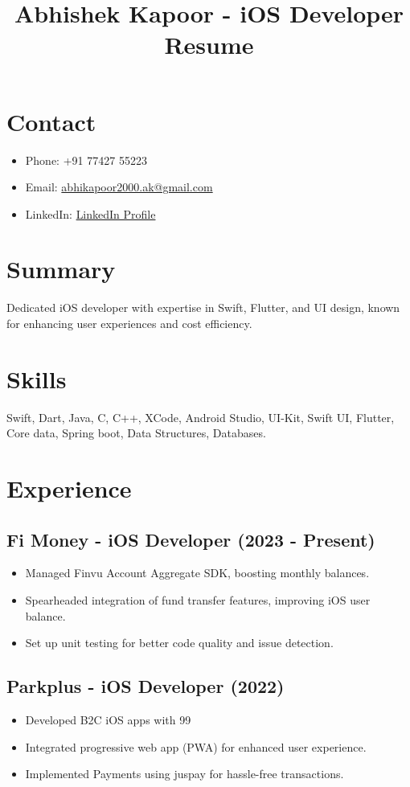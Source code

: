 \documentclass[a4paper,10pt]{article}
\makeatletter
\renewcommand\maketitle{
    \begin{flushleft}
        \huge\textbf{\@title}
    \end{flushleft}
}
\makeatother
\begin{document}
\title{Abhishek Kapoor - iOS Developer Resume}
\date{}
\maketitle

\section*{Contact}
\begin{itemize}
    \item Phone: +91 77427 55223
    \item Email: \href{mailto:abhikapoor2000.ak@gmail.com}{abhikapoor2000.ak@gmail.com}
    \item LinkedIn: \href{https://www.linkedin.com/in/abhishekkapoorfullstack/}{LinkedIn Profile}
\end{itemize}

\section*{Summary}
Dedicated iOS developer with expertise in Swift, Flutter, and UI design, known for enhancing user experiences and cost efficiency.

\section*{Skills}
Swift, Dart, Java, C, C++, XCode, Android Studio, UI-Kit, Swift UI, Flutter, Core data, Spring boot, Data Structures, Databases.

\section*{Experience}

\subsection*{Fi Money - iOS Developer (2023 - Present)}
\begin{itemize}
    \item Managed Finvu Account Aggregate SDK, boosting monthly balances.
    \item Spearheaded integration of fund transfer features, improving iOS user balance.
    \item Set up unit testing for better code quality and issue detection.
\end{itemize}

\subsection*{Parkplus - iOS Developer (2022)}
\begin{itemize}
    \item Developed B2C iOS apps with 99%
    \item Integrated progressive web app (PWA) for enhanced user experience.
    \item Implemented Payments using juspay for hassle-free transactions.
\end{itemize}
\end{document}

